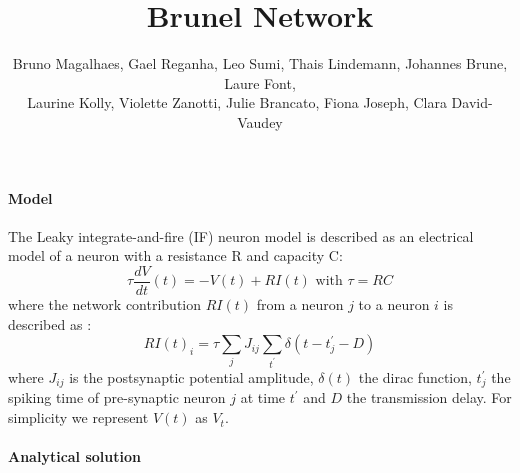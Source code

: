 \documentclass[a4paper]{article}
\begin{document}
\title{Brunel Network}
\author{Bruno Magalhaes, Gael Reganha, Leo Sumi, Thais Lindemann, Johannes Brune, Laure Font,\\ Laurine Kolly, Violette Zanotti, Julie Brancato, Fiona Joseph, Clara David-Vaudey}
\maketitle

\paragraph{Model}

The Leaky integrate-and-fire (IF) neuron model is described as an electrical model of a neuron with a resistance R and capacity C:
\begin{equation}
  \tau \frac{dV}{dt}(t) = -V(t) + RI(t) \text{ with } \tau = R C 
  \label{equation_diff}
\end{equation}
where the network contribution $RI(t)$ from a neuron $j$ to a neuron $i$ is described as :
\begin{equation}
   RI(t)_i = \tau \sum_{j} J_{ij} \sum_{t^\prime} \delta (t-t^\prime _{j} -D)
  \label{equation_current}
\end{equation}
where $J_{ij}$ is the postsynaptic potential amplitude, 
$\delta (t)$ the dirac function, $t^\prime _{j}$ the spiking time of pre-synaptic neuron $j$ at time $t^\prime$ and 
$D$ the transmission delay. For simplicity we represent $V(t)$ as $V_t$. \\

\paragraph{Analytical solution}
\end{document}

